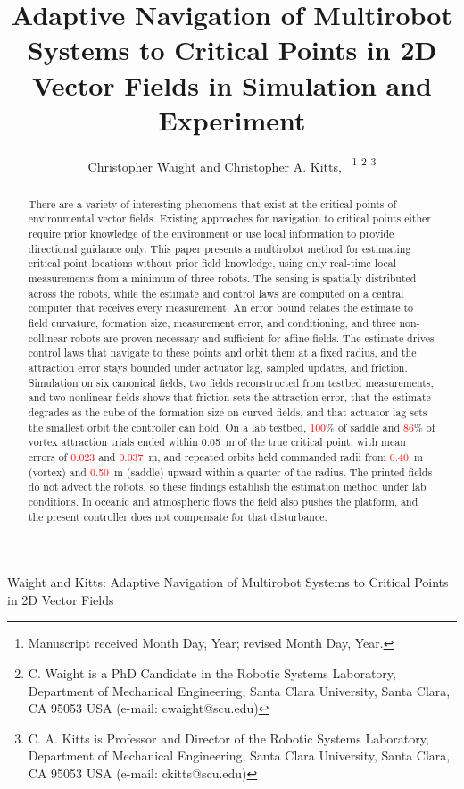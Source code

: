 \documentclass[lettersize,journal]{IEEEtran}
\newcommand{\syn}[1]{\textcolor{red}{#1}}            %
\begin{document}
\title{Adaptive Navigation of Multirobot Systems to Critical Points in 2D Vector Fields in Simulation and Experiment}
\author{Christopher Waight and Christopher A. Kitts,~
\thanks{Manuscript received Month Day, Year; revised Month Day, Year.}
\thanks{C. Waight is a PhD Candidate in the Robotic Systems Laboratory, Department of Mechanical Engineering, Santa Clara University, Santa Clara, CA 95053 USA (e-mail: cwaight@scu.edu)}
\thanks{C. A. Kitts is Professor and Director of the Robotic Systems Laboratory, Department of Mechanical Engineering, Santa Clara University, Santa Clara, CA 95053 USA (e-mail: ckitts@scu.edu)}
}
%
{Waight and Kitts: Adaptive Navigation of Multirobot Systems to Critical Points in 2D Vector Fields}


\maketitle

\begin{abstract}
    There are a variety of interesting phenomena that exist at the critical points of environmental vector fields. Existing approaches for navigation to critical points either require prior knowledge of the environment or use local information to provide directional guidance only. This paper presents a multirobot method for estimating critical point locations without prior field knowledge, using only real-time local measurements from a minimum of three robots. The sensing is spatially distributed across the robots, while the estimate and control laws are computed on a central computer that receives every measurement. An error bound relates the estimate to field curvature, formation size, measurement error, and conditioning, and three non-collinear robots are proven necessary and sufficient for affine fields. The estimate drives control laws that navigate to these points and orbit them at a fixed radius, and the attraction error stays bounded under actuator lag, sampled updates, and friction. Simulation on six canonical fields, two fields reconstructed from testbed measurements, and two nonlinear fields shows that friction sets the attraction error, that the estimate degrades as the cube of the formation size on curved fields, and that actuator lag sets the smallest orbit the controller can hold. On a lab testbed, \syn{100}\% of saddle and \syn{86}\% of vortex attraction trials ended within 0.05~m of the true critical point, with mean errors of \syn{0.023} and \syn{0.037}~m, and repeated orbits held commanded radii from \syn{0.40}~m (vortex) and \syn{0.50}~m (saddle) upward within a quarter of the radius. The printed fields do not advect the robots, so these findings establish the estimation method under lab conditions. In oceanic and atmospheric flows the field also pushes the platform, and the present controller does not compensate for that disturbance. %
\end{abstract}
\end{document}
